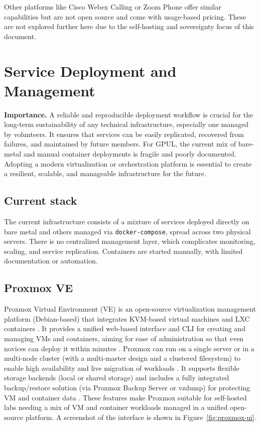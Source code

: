Other platforms like Cisco Webex Calling or Zoom Phone offer similar capabilities but are not open source and come with usage-based pricing. These are not explored further here due to the self-hosting and sovereignty focus of this document.

\section{Service Deployment and Management}

\textbf{Importance.} A reliable and reproducible deployment workflow is crucial for the long-term sustainability of any technical infrastructure, especially one managed by volunteers. It ensures that services can be easily replicated, recovered from failures, and maintained by future members. For GPUL, the current mix of bare-metal and manual container deployments is fragile and poorly documented. Adopting a modern virtualization or orchestration platform is essential to create a resilient, scalable, and manageable infrastructure for the future.

\subsection*{Current stack}
The current infrastructure consists of a mixture of services deployed directly on bare metal and others managed via \texttt{docker-compose}, spread across two physical servers. There is no centralized management layer, which complicates monitoring, scaling, and service replication. Containers are started manually, with limited documentation or automation.

\subsection*{Proxmox VE}

Proxmox Virtual Environment (VE) is an open-source virtualization management platform (Debian-based) that integrates KVM-based virtual machines and LXC containers \cite{ProxmoxAdminGuide2025}. It provides a unified web-based interface and CLI for creating and managing VMs and containers, aiming for ease of administration so that even novices can deploy it within minutes \cite{ProxmoxAdminGuide2025}. Proxmox can run on a single server or in a multi-node cluster (with a multi-master design and a clustered filesystem) to enable high availability and live migration of workloads \cite{ProxmoxAdminGuide2025}. It supports flexible storage backends (local or shared storage) and includes a fully integrated backup/restore solution (via Proxmox Backup Server or vzdump) for protecting VM and container data \cite{ProxmoxAdminGuide2025}. These features make Proxmox suitable for self-hosted labs needing a mix of VM and container workloads managed in a unified open-source platform. A screenshot of the interface is shown in Figure~\ref{fig:proxmox-ui}.

